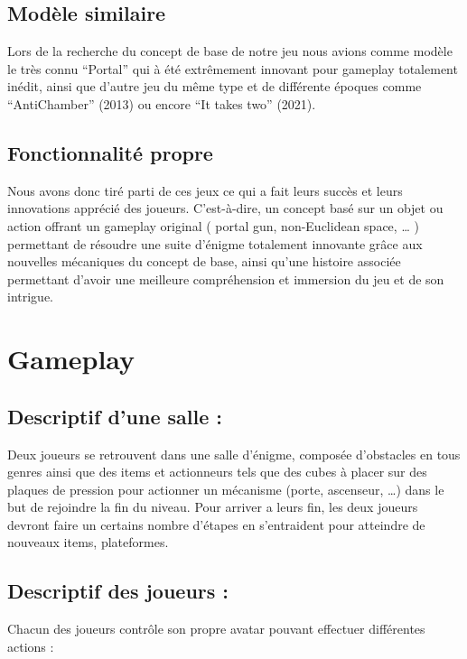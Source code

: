 \documentclass[a4paper,11pt]{article}
\begin{document}
\subsection{Modèle similaire}

Lors de la recherche du concept de base de notre jeu nous avions comme modèle le très connu “Portal” 
qui à été extrêmement innovant pour gameplay totalement inédit, ainsi que d’autre jeu du même type et 
de différente époques comme “AntiChamber” (2013) ou encore “It takes two” (2021). 

\subsection{Fonctionnalité propre}

Nous avons donc tiré parti de ces jeux ce qui a fait leurs succès et leurs innovations apprécié des joueurs. C’est-à-dire, 
un concept basé sur un objet ou action offrant un gameplay original ( portal gun, non-Euclidean space, … ) permettant de résoudre 
une suite d'énigme totalement innovante grâce aux nouvelles mécaniques du concept de base, ainsi qu’une 
histoire associée permettant d’avoir une meilleure compréhension et immersion du jeu et de son intrigue.


\section{Gameplay}

\subsection{Descriptif d’une salle :} 

Deux joueurs se retrouvent dans une salle d'énigme, 
composée d’obstacles en tous genres ainsi que des items et actionneurs tels que des cubes 
à placer sur des plaques de pression pour actionner un mécanisme (porte, ascenseur, …) dans 
le but de rejoindre la fin du niveau. Pour arriver a leurs fin, les deux joueurs devront faire 
un certains nombre d’étapes en s’entraident pour atteindre de nouveaux items, plateformes.

\newpage

\subsection{Descriptif des joueurs :} 

Chacun des joueurs contrôle son propre avatar pouvant effectuer différentes actions : 
\newline
\end{document}
